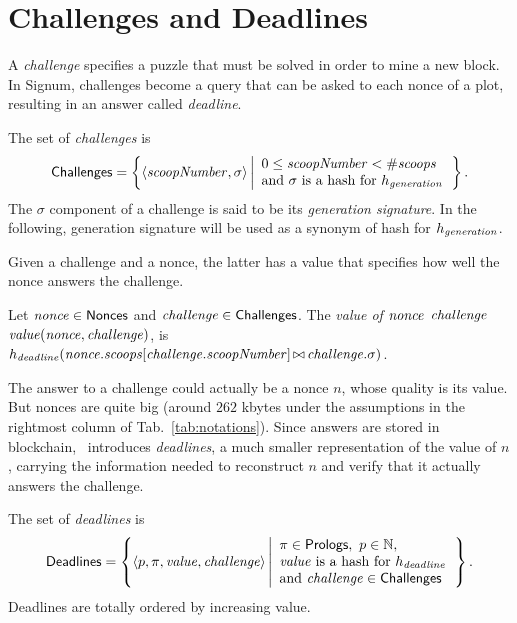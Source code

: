 \section{Challenges and Deadlines}\label{sec:challenges_and_deadlines}

A \emph{challenge} specifies a puzzle that must be solved in order to mine
a new block. In Signum, challenges become a query that can be asked to each nonce of a plot,
resulting in an answer called \emph{deadline}.
%
\begin{definition}[Challenge]\label{def:challenge}
  The set of \emph{challenges} is
  \[
  {\mathsf{Challenges}}=\left\{\langle{\mathit{scoopNumber}},\sigma\rangle\left|
  \begin{array}{l}
    0\le{\mathit{scoopNumber}}<{\#\mathit{scoops}}\\
    \text{and $\sigma$ is a hash for $h_{\mathit{generation}}$}
  \end{array}
  \right.\right\}.
  \]
  The $\sigma$ component of a challenge is said to be its \emph{generation signature}.
  In the following, generation signature will be used as a synonym of hash for $h_{\mathit{generation}}$.
\end{definition}
%
Given a challenge and a nonce, the latter has a value that specifies how well
the nonce answers the challenge.
%
\begin{definition}\label{def:nonce_value}
  Let ${\mathit{nonce}}\in{\mathsf{Nonces}}$ and ${\mathit{challenge}}\in{\mathsf{Challenges}}$.
  The \emph{value of ${\mathit{nonce}}$ \wrt ${\mathit{challenge}}$}\ie $\mathit{value}({\mathit{nonce}},{\mathit{challenge}})$, is
    $h_{\mathit{deadline}}({\mathit{nonce}}.{\mathit{scoops}}[{\mathit{challenge}}.{\mathit{scoopNumber}}]\operatorname*{\bowtie}{\mathit{challenge}}.\sigma)$.
\end{definition}
%
The answer to a challenge could actually be a nonce $n$, whose quality is its value.
But nonces are quite big (around $262$ kbytes under the assumptions in the
rightmost column of Tab.~\ref{tab:notations}). Since answers are stored in blockchain,
\cite{SignumPlotting}~introduces \emph{deadlines}, a much smaller representation of the value of
$n$, carrying the information needed to reconstruct $n$ and verify that it actually
answers the challenge.
%
\begin{definition}[Deadline]\label{def:deadline}
  The set of \emph{deadlines} is
  \[
  {\mathsf{Deadlines}}=\left\{
  \langle p,\pi,\mathit{value},{\mathit{challenge}}\rangle
  \left|\begin{array}{l}
  \pi\in{\mathsf{Prologs}},\ p\in\mathbb{N},\\
  \mathit{value}\text{ is a hash for }h_{\mathit{deadline}}\\
  \text{and }{\mathit{challenge}}\in{\mathsf{Challenges}}
  \end{array}
  \right.
  \right\}.
  \]
  Deadlines are totally ordered by increasing value.
\end{definition}
